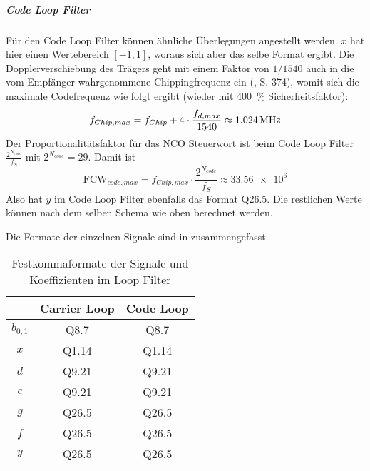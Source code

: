 \subparagraph{Code Loop Filter}
Für den Code Loop Filter können ähnliche Überlegungen angestellt werden. $x$ hat hier einen Wertebereich $[-1, 1]$, woraus sich aber das selbe Format ergibt. Die Dopplerverschiebung des Trägers geht mit einem Faktor von $1/1540$ auch in die vom Empfänger wahrgenommene Chippingfrequenz ein (\cite{parkinsonGPS}, S. 374), womit sich die maximale Codefrequenz wie folgt ergibt (wieder mit \SI{400}{\percent} Sicherheitsfaktor):
\begin{equation}
    f_{Chip,max} = \gpsfchip + 4 \cdot \frac{f_{d,max}}{1540}\approx \SI{1.024}{\MHz}
\end{equation}
Der Proportionalitätsfaktor für das NCO Steuerwort ist beim Code Loop Filter  $\frac{2^{N_{code}}}{f_S}$ mit $2^{N_{code}}=29$. Damit ist 
\begin{equation}
    \textrm{FCW}_{code,max} = f_{Chip,max} \cdot \frac{2^{N_{code}}}{f_S} \approx \num{33.56e6}
\end{equation}
Also  hat $y$ im Code Loop Filter  ebenfalls das Format Q26.5. Die restlichen Werte können nach dem selben Schema wie oben berechnet werden.

Die Formate der einzelnen Signale sind in  zusammengefasst.


\begin{table}[htbp]
    \ttabbox
    {
        \caption[Filter Koeffizienten]{Festkommaformate der Signale und Koeffizienten im Loop Filter}
        \label{TabKoeffFixpointFormat}
    }
    {
    \begin{tabular}{c c c}
        \toprule
                & Carrier Loop      & Code Loop     \\
        \midrule
        $b_{0,1}$&  Q8.7            & Q8.7 \\
        $x$     &   Q1.14           & Q1.14 \\
        $d$     &   Q9.21           & Q9.21 \\
        $c$     &   Q9.21           & Q9.21 \\
        $g$     &   Q26.5           & Q26.5 \\
        $f$     &   Q26.5           & Q26.5\\
        $y$     &   Q26.5           & Q26.5 \\
        \bottomrule
    \end{tabular}
}
\end{table}

